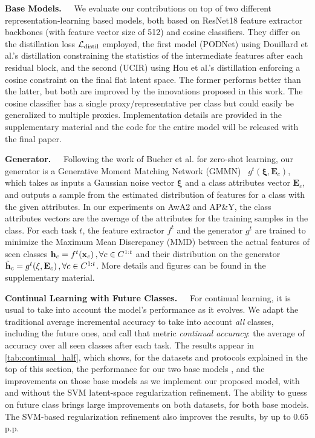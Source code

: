 \textbf{Base Models.~~} We evaluate our contributions on top of two different
representation-learning based models, both based on ResNet18 \cite{he2016resnet} feature extractor
backbones (with feature vector size of 512) and cosine classifiers. They differ on the distillation
loss $\mathcal{L}_\text{distil}$ employed, the first model (PODNet) using Douillard et al.'s distillation
\cite{douillard2020podnet} constraining the statistics of the intermediate features after each
residual block, and the second (UCIR) using Hou et al.'s distillation \cite{hou2019ucir} enforcing a
cosine constraint on the final flat latent space. The former performs better than the latter, but
both are improved by the innovations proposed in this work. The cosine classifier has a single
proxy/representative per class but could easily be generalized to multiple proxies. Implementation
details are provided in the supplementary material and the code for the entire model will be
released with the final paper.

\textbf{Generator.~~} Following the work of Bucher et al. \cite{bucher2017zeroshot_gmmn} for
zero-shot learning, our generator is a Generative Moment Matching Network (GMMN)~\cite{li2015gmmn}
$g^t(\mathbf{\xi}, \mathbf{E}_c)$, which takes as inputs a Gaussian noise vector $\mathbf{\xi}$ and
a class attributes vector $\mathbf{E}_c$, and outputs a sample from the estimated distribution of
features for a class with the given attributes. In our experiments on AwA2 and AP\&Y, the class
attributes vectors are the average of the attributes for the training samples in the class. For each
task $t$, the feature extractor $f^t$ and the generator $g^t$ are trained to minimize the Maximum
Mean Discrepancy (MMD) \cite{gretton2007twosampleMMD,gretton2012twosampletestMMD} between the actual
features of seen classes $\mathbf{h}_c = f^t(\mathbf{x}_c) \, , \forall c \in C^{1:t}$ and their distribution on
the generator $\tilde{\mathbf{h}}_c = g^t(\mathbf{\xi}, \mathbf{E}_{c}) \,, \forall c \in C^{1:t}$. More
details and figures can be found in the supplementary material.




\textbf{Continual Learning with Future Classes.~~}
For continual learning, it is usual to take into account the model's performance as it evolves. We
adapt the traditional average incremental accuracy \cite{rebuffi2017icarl} to take into account
\textit{all} classes, including the future ones, and call that metric \textit{continual accuracy}:
the average of accuracy over all seen classes after each task. The results appear in
\autoref{tab:continual_half}, which shows, for the datasets and protocols explained in the top of
this section, the performance for our two base models \cite{hou2019ucir,douillard2020podnet}, and
the improvements on those base models as we implement our proposed model, with and without the SVM
latent-space regularization refinement. The ability to guess on future class brings large
improvements on both datasets, for both base models. The SVM-based regularization refinement also
improves the results, by up to 0.65 p.p.

